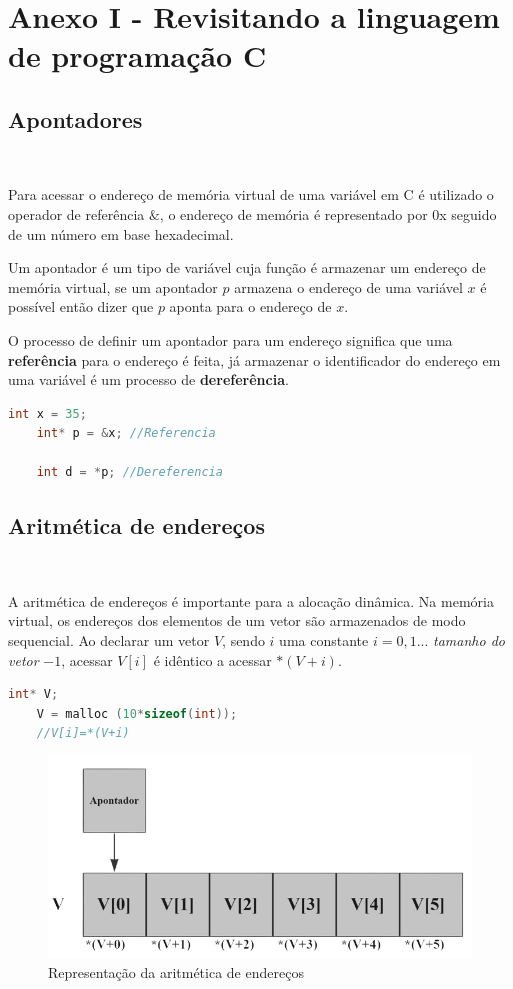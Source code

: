 \section*{Anexo I - Revisitando a linguagem de programação C}
\subsection*{Apontadores}
\

Para acessar o endereço de memória virtual de uma variável em C é utilizado o operador de referência $\&$, o endereço de memória é representado por 0x seguido de um número em base hexadecimal.

Um apontador é um tipo de variável cuja função é armazenar um endereço de memória virtual, se um apontador $p$ armazena o endereço de uma variável $x$ é possível então dizer que $p$ aponta para o endereço de $x$.

O processo de definir um apontador para um endereço significa que uma \textbf{referência} para o endereço é feita, já armazenar o identificador do endereço em uma variável é um processo de \textbf{dereferência}.

\begin{lstlisting}[language=C, frame=single]
    int x = 35;
    int* p = &x; //Referencia

    int d = *p; //Dereferencia
\end{lstlisting}

\subsection*{Aritmética de endereços}
\

A aritmética de endereços é importante para a alocação dinâmica. Na memória virtual, os endereços dos elementos de um vetor são armazenados de modo sequencial. Ao declarar um vetor $V$, sendo $i$ uma constante $i=0, 1 ...$ \textit{tamanho do vetor} $-1$, acessar $V[i]$ é idêntico a acessar $*(V+i)$.

\begin{lstlisting}[language=C, frame=single]
    int* V; 
    V = malloc (10*sizeof(int));
    //V[i]=*(V+i)
\end{lstlisting}

\begin{figure}[h]
  \centering
  \includegraphics[width=0.7\linewidth]{img/aritmeticaenderecos.png}
    \caption{Representação da aritmética de endereços}
    \label{aritimeticaenderecos}
\end{figure}

